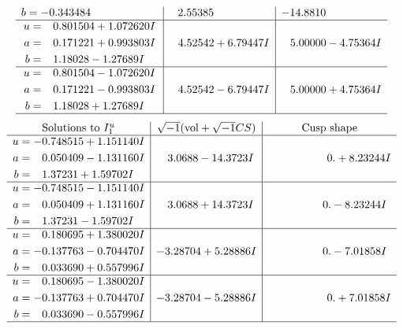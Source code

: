 \documentclass[1p]{elsarticle_modified}
\theoremstyle{definition}
\newcommand{\I}{\sqrt{-1}}
\begin{document}
$$\begin{array}{c|c|c}
\begin{aligned}
b &= -0.343484\phantom{ +0.000000I}\end{aligned}
 & \phantom{-}2.55385\phantom{ +0.000000I} & -14.8810\phantom{ +0.000000I} \\ \hline\begin{aligned}
u &= \phantom{-}0.801504 + 1.072620 I \\
a &= \phantom{-}0.171221 + 0.993803 I \\
b &= \phantom{-}1.18028 - 1.27689 I\end{aligned}
 & \phantom{-}4.52542 + 6.79447 I & \phantom{-}5.00000 - 4.75364 I \\ \hline\begin{aligned}
u &= \phantom{-}0.801504 - 1.072620 I \\
a &= \phantom{-}0.171221 - 0.993803 I \\
b &= \phantom{-}1.18028 + 1.27689 I\end{aligned}
 & \phantom{-}4.52542 - 6.79447 I & \phantom{-}5.00000 + 4.75364 I\\
 \hline 
 \end{array}$$\newpage$$\begin{array}{c|c|c}  
\text{Solutions to }I^u_{1}& \I (\text{vol} + \sqrt{-1}CS) & \text{Cusp shape}\\
 \hline 
\begin{aligned}
u &= -0.748515 + 1.151140 I \\
a &= \phantom{-}0.050409 - 1.131160 I \\
b &= \phantom{-}1.37231 + 1.59702 I\end{aligned}
 & \phantom{-}3.0688 - 14.3723 I & \phantom{-0.000000 -}0. + 8.23244 I \\ \hline\begin{aligned}
u &= -0.748515 - 1.151140 I \\
a &= \phantom{-}0.050409 + 1.131160 I \\
b &= \phantom{-}1.37231 - 1.59702 I\end{aligned}
 & \phantom{-}3.0688 + 14.3723 I & \phantom{-0.000000 } 0. - 8.23244 I \\ \hline\begin{aligned}
u &= \phantom{-}0.180695 + 1.380020 I \\
a &= -0.137763 - 0.704470 I \\
b &= \phantom{-}0.033690 + 0.557996 I\end{aligned}
 & -3.28704 + 5.28886 I & \phantom{-0.000000 } 0. - 7.01858 I \\ \hline\begin{aligned}
u &= \phantom{-}0.180695 - 1.380020 I \\
a &= -0.137763 + 0.704470 I \\
b &= \phantom{-}0.033690 - 0.557996 I\end{aligned}
 & -3.28704 - 5.28886 I & \phantom{-0.000000 -}0. + 7.01858 I\\
 \hline 
 \end{array}$$\newpage\newpage\renewcommand{\arraystretch}{1}
\end{document}
